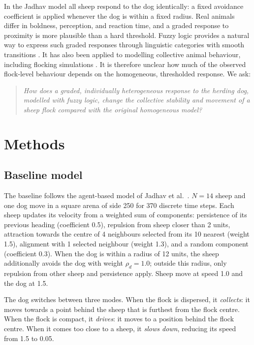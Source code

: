 \documentclass[9pt,twoside]{pnas-new}
\begin{document}
In the Jadhav model all sheep respond to the dog identically: a fixed avoidance coefficient is applied whenever the dog is within a fixed radius. Real animals differ in boldness, perception, and reaction time, and a graded response to proximity is more plausible than a hard threshold. Fuzzy logic provides a natural way to express such graded responses through linguistic categories with smooth transitions \cite{zadeh1965}. It has also been applied to modelling collective animal behaviour, including flocking simulations \cite{lebarbajec2005}. It is therefore unclear how much of the observed flock-level behaviour depends on the homogeneous, thresholded response. We ask:

\begin{quote}
\emph{How does a graded, individually heterogeneous response to the herding dog, modelled with fuzzy logic, change the collective stability and movement of a sheep flock compared with the original homogeneous model?}
\end{quote}

\section{Methods}

\subsection{Baseline model}
The baseline follows the agent-based model of Jadhav et al.\ \cite{jadhav2024}. $N=14$ sheep and one dog move in a square arena of side 250 for 370 discrete time steps. Each sheep updates its velocity from a weighted sum of components: persistence of its previous heading (coefficient 0.5), repulsion from sheep closer than 2 units, attraction towards the centre of 4 neighbours selected from its 10 nearest (weight 1.5), alignment with 1 selected neighbour (weight 1.3), and a random component (coefficient 0.3). When the dog is within a radius of 12 units, the sheep additionally avoids the dog with weight $\rho_d=1.0$; outside this radius, only repulsion from other sheep and persistence apply. Sheep move at speed 1.0 and the dog at 1.5.

The dog switches between three modes. When the flock is dispersed, it \emph{collects}: it moves towards a point behind the sheep that is furthest from the flock centre. When the flock is compact, it \emph{drives}: it moves to a position behind the flock centre. When it comes too close to a sheep, it \emph{slows down}, reducing its speed from 1.5 to 0.05.
\end{document}
